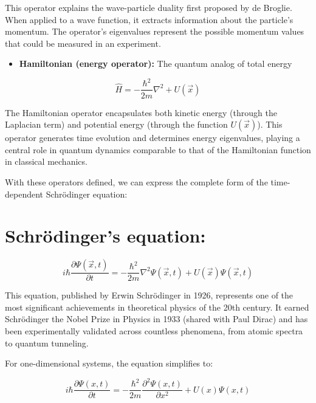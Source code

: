 \documentclass[10pt]{article}
\begin{document}
This operator explains the wave-particle duality first proposed by de Broglie. When applied to a wave function, it extracts information about the particle's momentum. The operator's eigenvalues represent the possible momentum values that could be measured in an experiment.

\begin{itemize}
  \item \textbf{Hamiltonian (energy operator):} The quantum analog of total energy
\end{itemize}

\begin{equation*}
\hat{H}=-\frac{\hbar^{2}}{2 m} \nabla^{2}+U(\vec{x}) \tag{1.14}
\end{equation*}

The Hamiltonian operator encapsulates both kinetic energy (through the Laplacian term) and potential energy (through the function $U(\vec{x})$). This operator generates time evolution and determines energy eigenvalues, playing a central role in quantum dynamics comparable to that of the Hamiltonian function in classical mechanics.

With these operators defined, we can express the complete form of the time-dependent Schrödinger equation:

\section*{Schrödinger's equation:}

\begin{equation*}
i \hbar \frac{\partial \Psi(\vec{x}, t)}{\partial t}=-\frac{\hbar^{2}}{2 m} \nabla^{2} \Psi(\vec{x}, t)+U(\vec{x}) \Psi(\vec{x}, t) \tag{1.15}
\end{equation*}

This equation, published by Erwin Schrödinger in 1926, represents one of the most significant achievements in theoretical physics of the 20th century. It earned Schrödinger the Nobel Prize in Physics in 1933 (shared with Paul Dirac) and has been experimentally validated across countless phenomena, from atomic spectra to quantum tunneling.

For one-dimensional systems, the equation simplifies to:

\begin{equation*}
i \hbar \frac{\partial \Psi(x, t)}{\partial t}=-\frac{\hbar^{2}}{2 m} \frac{\partial^{2} \Psi(x, t)}{\partial x^{2}}+U(x) \Psi(x, t) \tag{1.16}
\end{equation*}
\end{document}
